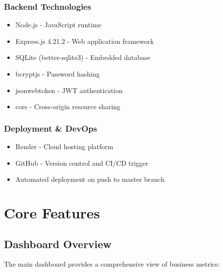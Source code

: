 \documentclass[12pt,a4paper]{article}
\begin{document}
\subsubsection{Backend Technologies}
\begin{itemize}[leftmargin=*]
    \item Node.js - JavaScript runtime
    \item Express.js 4.21.2 - Web application framework
    \item SQLite (better-sqlite3) - Embedded database
    \item bcryptjs - Password hashing
    \item jsonwebtoken - JWT authentication
    \item cors - Cross-origin resource sharing
\end{itemize}

\subsubsection{Deployment \& DevOps}
\begin{itemize}[leftmargin=*]
    \item Render - Cloud hosting platform
    \item GitHub - Version control and CI/CD trigger
    \item Automated deployment on push to master branch
\end{itemize}

\newpage

\section{Core Features}

\subsection{Dashboard Overview}


The main dashboard provides a comprehensive view of business metrics:
\end{document}
